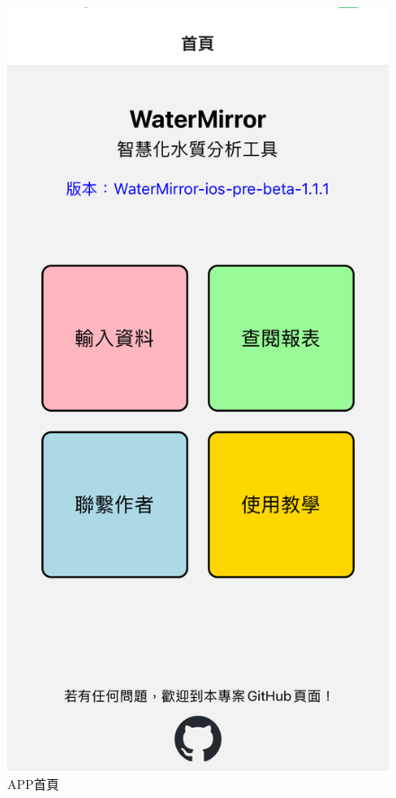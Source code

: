 \documentclass[12pt,a4paper]{article}
\begin{document}
\begin{enumerate}
\begin{enumerate}[label=\arabic*.]
\begin{enumerate}[label=3-2-\arabic*.]
\begin{figure}[H]
\begin{minipage}{0.35\textwidth}
                    \includegraphics[width=\textwidth]{resources/image/front-end/APP首頁.png}
                    \caption{APP首頁}
                \end{minipage}%
                \hfill
                \begin{minipage}{0.35\textwidth}

\end{minipage}
\end{figure}
\end{enumerate}
\end{enumerate}
\end{enumerate}
\end{document}
